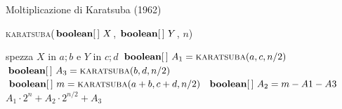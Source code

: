 \begin{frame}[shrink=5]{Moltiplicazione di Karatsuba (1962)}

\vspace{-12pt}

\begin{Procedure}
\caption[A]{\BOOLEAN[\,] \textsc{karatsuba}($\BOOLEAN[\,]\ X$, $\BOOLEAN[\,]\ Y$, \INTEGER $n$)}
{
  spezza $X$ in $a;b$ e $Y$ in $c;d$\;
  $\BOOLEAN[\,]\ A_1 = \textsc{karatsuba}(a,c, n/2)$\;
  $\BOOLEAN[\,]\ A_3 = \textsc{karatsuba}(b,d, n/2)$\;
  $\BOOLEAN[\,]\ m  = \textsc{karatsuba}(a+b,c+d, n/2)$\;
  $\BOOLEAN[\,]\ A_2 = m-A1-A3$\;
  \Return $A_1\cdot 2^n + A_2 \cdot 2^{n/2} + A_3$\;
}
\end{Procedure}

\end{frame}

